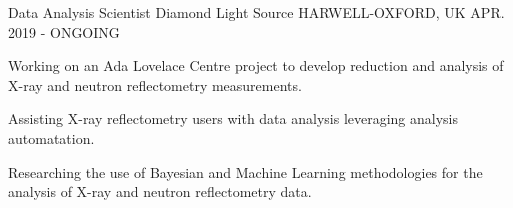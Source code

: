 \begin{cventries}
  \cventry
    {Data Analysis Scientist}
    {Diamond Light Source}
    {HARWELL-OXFORD, UK}
    {APR. 2019 - ONGOING}
    {
      \begin{cvitems}
        \item {Working on an Ada Lovelace Centre project to develop reduction and analysis of X-ray and neutron reflectometry measurements.}
        \item {Assisting X-ray reflectometry users with data analysis leveraging analysis automatation.}
        \item {Researching the use of Bayesian and Machine Learning methodologies for the analysis of X-ray and neutron reflectometry data.}
      \end{cvitems}
    }
\end{cventries}
